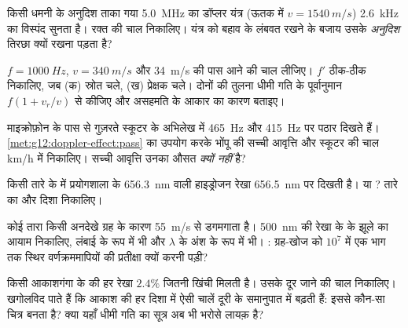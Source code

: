 \begin{exercise}[$\star\star$]\label{exo:g12:doppler-effect:8}
किसी धमनी के अनुदिश ताका गया \qty{5.0}{MHz} का डॉप्लर  यंत्र (ऊतक
में $v = \qty{1540}{m/s}$) \qty{2.6}{kHz} का विस्पंद सुनता है। रक्त की चाल निकालिए। यंत्र को बहाव
के लंबवत रखने के बजाय उसके \emph{अनुदिश} तिरछा क्यों रखना पड़ता है?
\end{exercise}

\begin{exercise}[$\star\star$]\label{exo:g12:doppler-effect:9}
$f = \qty{1000}{Hz}$, $v = \qty{340}{m/s}$ और \qty{34}{m/s} की पास आने की चाल लीजिए। $f'$ ठीक-ठीक
निकालिए, जब (क) स्रोत चले, (ख) प्रेक्षक चले। दोनों की तुलना धीमी गति के
पूर्वानुमान $f(1 + v_r/v)$ से कीजिए और असहमति के आकार का कारण बताइए।
\end{exercise}

\begin{exercise}[$\star\star$]\label{exo:g12:doppler-effect:10}
माइक्रोफ़ोन के पास से गुज़रते स्कूटर के अभिलेख में \qty{465}{Hz} और \qty{415}{Hz} पर पठार
दिखते हैं। \cref{met:g12:doppler-effect:pass} का उपयोग करके भोंपू की सच्ची आवृत्ति और स्कूटर की
चाल \unit{km/h} में निकालिए। सच्ची आवृत्ति उनका औसत \emph{क्यों नहीं}
है?
\end{exercise}

\begin{exercise}[$\star\star$]\label{exo:g12:doppler-effect:11}
किसी तारे के  में प्रयोगशाला के  \qty{656.3}{nm}
वाली हाइड्रोजन रेखा \qty{656.5}{nm} पर दिखती है।  या
? तारे का  और दिशा निकालिए।
\end{exercise}

\begin{exercise}[$\star\star\star$]\label{exo:g12:doppler-effect:12}
कोई तारा किसी अनदेखे ग्रह के कारण \qty{55}{m/s} से डगमगाता है। \qty{500}{nm} की रेखा के
 के झूले का आयाम निकालिए, लंबाई के रूप में भी और
$\lambda$ के अंश के रूप में भी। : ग्रह-खोज को $10^{7}$
में एक भाग तक स्थिर वर्णक्रममापियों की प्रतीक्षा क्यों करनी पड़ी?
\end{exercise}

\begin{exercise}[$\star\star\star$]\label{exo:g12:doppler-effect:13}
किसी आकाशगंगा के  की हर रेखा $2.4\%$ जितनी खिंची मिलती है।
उसके दूर जाने की चाल निकालिए। खगोलविद पाते हैं कि आकाश की हर दिशा में ऐसी
चालें दूरी के समानुपात में बढ़ती हैं: इससे कौन-सा चित्र बनता है? क्या यहाँ धीमी
गति का सूत्र अब भी भरोसे लायक़ है?
\end{exercise}

